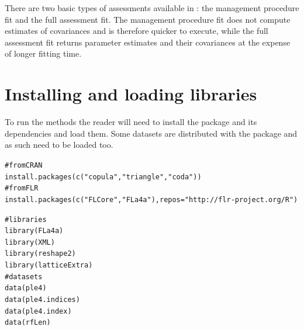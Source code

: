 \documentclass[a4paper,english,10pt]{article}\usepackage[]{graphicx}\usepackage[]{color}
\makeatletter
\newcommand{\hlstr}[1]{\textcolor[rgb]{0.063,0.58,0.627}{#1}}%
\newcommand{\hlcom}[1]{\textcolor[rgb]{0.588,0.588,0.588}{#1}}%
\newcommand{\hlstd}[1]{\textcolor[rgb]{0.196,0.196,0.196}{#1}}%
\newcommand{\hlkwc}[1]{\textcolor[rgb]{0,0.631,0.314}{#1}}%
\newcommand{\hlkwd}[1]{\textcolor[rgb]{0.78,0.227,0.412}{#1}}%
\newenvironment{kframe}{%
 \def\at@end@of@kframe{}%
 \ifinner\ifhmode%
  \def\at@end@of@kframe{\end{minipage}}%
  \begin{minipage}{\columnwidth}%
 \fi\fi%
 \def\FrameCommand##1{\hskip\@totalleftmargin \hskip-\fboxsep
 \colorbox{shadecolor}{##1}\hskip-\fboxsep
     \hskip-\linewidth \hskip-\@totalleftmargin \hskip\columnwidth}%
 \MakeFramed {\advance\hsize-\width
   \@totalleftmargin\z@ \linewidth\hsize
   \@setminipage}}%
 {\par\unskip\endMakeFramed%
 \at@end@of@kframe}
\newenvironment{knitrout}{}{} %
\makeatother
\begin{document}
There are two basic types of assessments available in \aFa: the management procedure fit and the full assessment fit. The management procedure fit does not compute estimates of covariances and is therefore quicker to execute, while the full assessment fit returns parameter estimates and their covariances at the expense of longer fitting time.




\section{Installing and loading libraries}

To run the  methods the reader will need to install the package and its dependencies and load them. Some datasets are distributed with the package and as such need to be loaded too.

\begin{knitrout}
\color{fgcolor}\begin{kframe}
\begin{alltt}
\hlcom{# from CRAN}
\hlkwd{install.packages}\hlstd{(}\hlkwd{c}\hlstd{(}\hlstr{"copula"}\hlstd{,} \hlstr{"triangle"}\hlstd{,} \hlstr{"coda"}\hlstd{))}
\hlcom{# from FLR}
\hlkwd{install.packages}\hlstd{(}\hlkwd{c}\hlstd{(}\hlstr{"FLCore"}\hlstd{,} \hlstr{"FLa4a"}\hlstd{),} \hlkwc{repos} \hlstd{=} \hlstr{"http://flr-project.org/R"}\hlstd{)}
\end{alltt}
\end{kframe}
\end{knitrout}

\begin{knitrout}
\color{fgcolor}\begin{kframe}
\begin{alltt}
\hlcom{# libraries}
\hlkwd{library}\hlstd{(FLa4a)}
\hlkwd{library}\hlstd{(XML)}
\hlkwd{library}\hlstd{(reshape2)}
\hlkwd{library}\hlstd{(latticeExtra)}
\hlcom{# datasets}
\hlkwd{data}\hlstd{(ple4)}
\hlkwd{data}\hlstd{(ple4.indices)}
\hlkwd{data}\hlstd{(ple4.index)}
\hlkwd{data}\hlstd{(rfLen)}
\end{alltt}
\end{kframe}
\end{knitrout}
\end{document}
